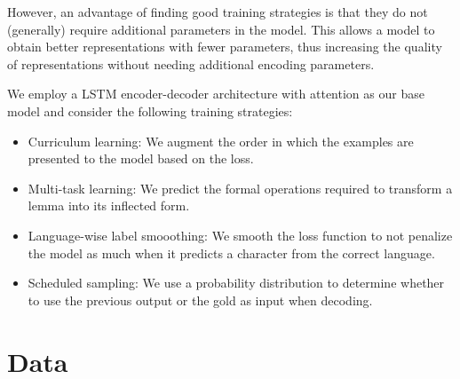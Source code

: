 \documentclass[11pt,a4paper]{article}
\begin{document}
However, an advantage of finding good training strategies is that they
do not (generally) require additional parameters in the model. This
allows a model to obtain better representations with fewer parameters,
thus increasing the quality of representations without needing
additional encoding parameters.




We employ a LSTM encoder-decoder architecture with attention as our
base model and consider the following training strategies:

\begin{itemize}
\item Curriculum learning: We augment the order in which the examples are presented to the model based on the loss.
\item Multi-task learning: We predict the formal operations required to transform a lemma into its inflected form.
\item Language-wise label smooothing: We smooth the loss function to not penalize the model as much when it predicts a character from the correct language.
\item Scheduled sampling: We use a probability distribution to determine whether to use the previous output or the gold as input when decoding.
\end{itemize}

%


\section{Data}
\end{document}
